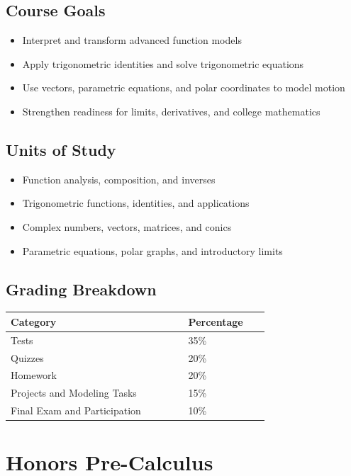 \documentclass[12pt,oneside]{book}
\begin{document}
\section{Course Goals}
\begin{itemize}[leftmargin=2em]
    \item Interpret and transform advanced function models
    \item Apply trigonometric identities and solve trigonometric equations
    \item Use vectors, parametric equations, and polar coordinates to model motion
    \item Strengthen readiness for limits, derivatives, and college mathematics
\end{itemize}

\section{Units of Study}
\begin{itemize}[leftmargin=2em]
    \item Function analysis, composition, and inverses
    \item Trigonometric functions, identities, and applications
    \item Complex numbers, vectors, matrices, and conics
    \item Parametric equations, polar graphs, and introductory limits
\end{itemize}

\section{Grading Breakdown}
\begin{center}
\begin{tabular}{L{0.55\linewidth}L{0.25\linewidth}}
\toprule
\textbf{Category} & \textbf{Percentage} \\
\midrule
Tests & 35\% \\
Quizzes & 20\% \\
Homework & 20\% \\
Projects and Modeling Tasks & 15\% \\
Final Exam and Participation & 10\% \\
\bottomrule
\end{tabular}
\end{center}

\chapter{Honors Pre-Calculus}
\end{document}
